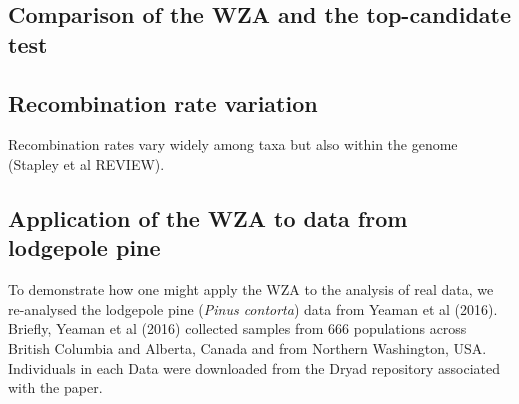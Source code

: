 \documentclass[11pt,twoside,lineno]{GSA_format}
\begin{document}
\subsection{Comparison of the WZA and the top-candidate test}

\subsection{Recombination rate variation}

Recombination rates vary widely among taxa but also within the genome (Stapley et al REVIEW). 

\subsection{Application of the WZA to data from lodgepole pine}

To demonstrate how one might apply the WZA to the analysis of real data, we re-analysed the lodgepole pine (\textit{Pinus contorta}) data from Yeaman et al (2016). Briefly, Yeaman et al (2016) collected samples from 666 populations across British Columbia and Alberta, Canada and from Northern Washington, USA. Individuals in each 
Data were downloaded from the Dryad repository associated with the paper. 
\end{document}
